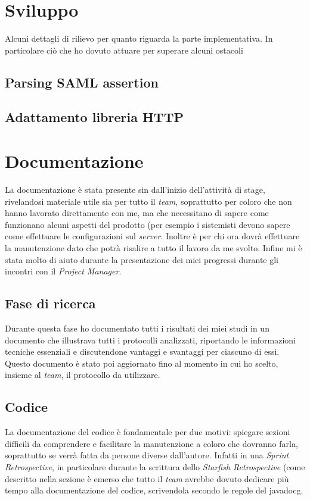 \section{Sviluppo}
Alcuni dettagli di rilievo per quanto riguarda la parte implementativa. In particolare ciò che ho dovuto attuare per superare alcuni ostacoli
\subsection{Parsing SAML assertion}
\subsection{Adattamento libreria HTTP}

\section{Documentazione}
La documentazione è stata presente sin dall'inizio dell'attività di stage, rivelandosi materiale utile sia per tutto il \textit{team}, soprattutto per coloro che non hanno lavorato direttamente con me, ma che necessitano di sapere come funzionano alcuni aspetti del prodotto (per esempio i sistemisti devono sapere come effettuare le configurazioni sul \textit{server}. Inoltre è per chi ora dovrà effettuare la manutenzione dato che potrà risalire a tutto il lavoro da me svolto. Infine mi è stata molto di aiuto durante la presentazione dei miei progressi durante gli incontri con il \textit{Project Manager}.
\subsection{Fase di ricerca}
Durante questa fase ho documentato tutti i risultati dei miei studi in un documento  che illustrava tutti i protocolli analizzati, riportando le informazioni tecniche essenziali e discutendone vantaggi e svantaggi per ciascuno di essi. Questo documento è stato poi aggiornato fino al momento in cui ho scelto, insieme al \textit{team}, il protocollo da utilizzare.
\subsection{Codice}
La documentazione del codice è fondamentale per due motivi: spiegare sezioni difficili da comprendere e facilitare la manutenzione a coloro che dovranno farla, soprattutto se verrà fatta da persone diverse dall'autore. Infatti in una \textit{Sprint Retrospective}, in particolare durante la scrittura dello \textit{Starfish Retrospective} (come descritto nella sezione  è emerso che tutto il \textit{team} avrebbe dovuto dedicare più tempo alla documentazione del codice, scrivendola secondo le regole del \gls{javadocg}.
